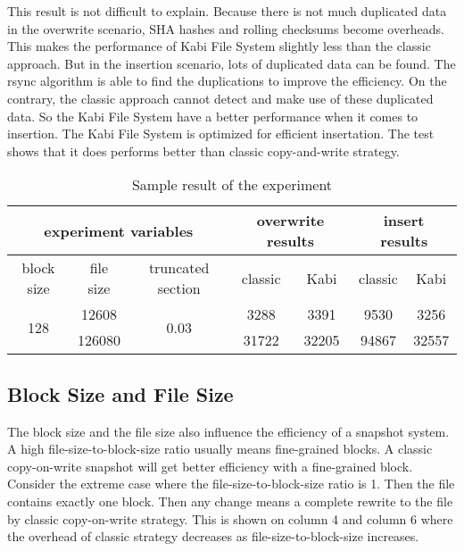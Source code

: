     This result is not difficult to explain. Because there is not much duplicated data in the overwrite scenario, SHA hashes and rolling checksums become overheads. This makes the performance of Kabi File System slightly less than the classic approach. But in the insertion scenario, lots of duplicated data can be found. The rsync algorithm is able to find the duplications to improve the efficiency. On the contrary, the classic approach cannot detect and make use of these duplicated data. So the Kabi File System have a better performance when it comes to insertion. The Kabi File System is optimized for efficient insertation. The test shows that it does performs better than classic copy-and-write strategy.

\begin{table}[t]
\label{tab:sample_result}
\begin{center}
\begin{tabular}{|c|c|c|cccc|}
\hline
\multicolumn{3}{|c|}{experiment variables} & \multicolumn{2}{c|}{overwrite results} & \multicolumn{2}{c|}{insert results}\\
\hline
block size & file size & truncated section & \multicolumn{1}{c|}{classic} & \multicolumn{1}{c|}{Kabi} & \multicolumn{1}{c|}{classic} & Kabi\\
\hline
\multirow{2}{*}{128} & 12608 & \multirow{2}{*}{0.03} & 3288 & 3391 & 9530 & 3256 \\
& 126080 & & 31722 & 32205 & 94867 & 32557 \\
\hline
\end{tabular}
\end{center}
\caption{Sample result of the experiment}
\end{table}

\subsection{Block Size and File Size}

    The block size and the file size also influence the efficiency of a snapshot system. A high file-size-to-block-size ratio usually means fine-grained blocks. A classic copy-on-write snapshot will get better efficiency with a fine-grained block. Consider the extreme case where the file-size-to-block-size ratio is 1. Then the file contains exactly one block. Then any change means a complete rewrite to the file by classic copy-on-write strategy. This is shown on  column 4 and column 6 where the overhead of classic strategy decreases as file-size-to-block-size increases.

